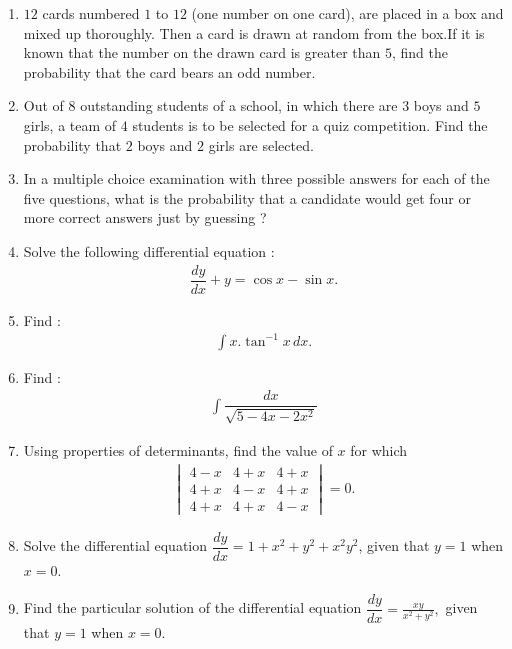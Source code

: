 \documentclass[12pt,-letter paper]{article}
\providecommand{\mydet}[1]{\ensuremath{\begin{vmatrix}#1\end{vmatrix}}}
\begin{document}
\begin{enumerate}
    \item $12$ cards numbered $1$ to $12$ (one number on one card), are placed in a box and mixed up thoroughly. Then a card is drawn at random from the box.If it is known that the number on the drawn card is greater than $5$, find the probability that the card bears an odd number.

    \item Out of $8$ outstanding students of a school, in which there are $3$ boys and $5$ girls, a team of $4$ students is to be selected for a quiz competition. Find the probability that $2$ boys and $2$ girls are selected.

    \item In a multiple choice examination with three possible answers for each of the five questions, what is the probability that a candidate would get four or more correct answers just by guessing ?

    \item Solve the following differential equation :
     \begin{align*}
         \dfrac{dy}{dx}+y=\cos{x} - \sin{x}.
     \end{align*}

     \item Find :
        \begin{align*}
            \int x.\tan^{-1}{x}  \,dx.
        \end{align*}

    \item Find :
        \begin{align*}
            \int \dfrac{dx}{\sqrt{5-4x-2x^2}}
        \end{align*}

    \item Using properties of determinants, find the value of $x$ for which
    \begin{align*}
        \mydet{4-x&4+x&4+x\\4+x&4-x&4+x\\4+x&4+x&4-x}=0.
    \end{align*}

    \item Solve the differential equation $\dfrac{dy}{dx}=1+x^{2}+y^{2}+x^{2}y^{2}$, given that $ y = 1 $ when $x = 0$.

    \item Find the particular solution of the differential equation $\dfrac{dy}{dx}=\frac{xy}{x^2+y^2},$ given that $y=1$ when $x=0$.
    

\end{enumerate}
\end{document}
